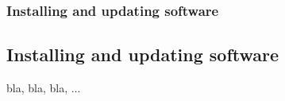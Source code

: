 \begin{frame}
	\frametitle{Installing and updating software}
	\subsection{Installing and updating software}
	
	bla, bla, bla, ...
\end{frame}
